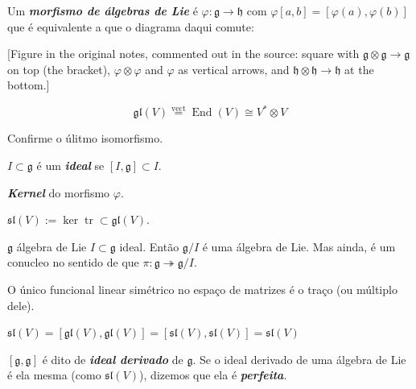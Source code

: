 \begin{definition}
\label{definition-heluani-morphism}
Um {\it\bf morfismo de álgebras de Lie} é
$\varphi:\mathfrak{g} \to \mathfrak{h}$ com
$\varphi[a,b]=[\varphi(a),\varphi(b)]$ que é
equivalente a que o diagrama daqui comute:

[Figure in the original notes, commented out
in the source: square with
$\mathfrak{g}\otimes\mathfrak{g}
\to\mathfrak{g}$
on top (the bracket), $\varphi\otimes\varphi$
and $\varphi$ as vertical arrows, and
$\mathfrak{h}\otimes\mathfrak{h}
\to\mathfrak{h}$
at the bottom.]
\end{definition}

$$\mathfrak{gl}(V)
\overset{\operatorname{vect}}{=}
\operatorname{End}(V)\cong
V^* \otimes V$$
\begin{exercise}
\label{exercise-heluani-iso}
Confirme o úlitmo isomorfismo.
\end{exercise}
\begin{definition}
\label{definition-heluani-ideal}
$I \subset \mathfrak{g}$ é um {\it\bf ideal}
se $[I,\mathfrak{g}] \subset I$.
\end{definition}

\begin{definition}
\label{definition-heluani-kernel}
{\it\bf Kernel} do morfismo $\varphi$.
\end{definition}
\begin{definition}
\label{definition-heluani-sl}
$\mathfrak{sl}(V):=\ker \operatorname{tr}
\subset \mathfrak{gl}(V)$.
\end{definition}
\begin{lemma}
\label{lemma-heluani-quotient}
$\mathfrak{g}$ álgebra de Lie $I \subset
\mathfrak{g}$ ideal. Então $\mathfrak{g}/I$ é
uma álgebra de Lie. Mas ainda, é um conucleo
no sentido de que $\pi:\mathfrak{g}
\twoheadrightarrow \mathfrak{g}/I$.
\end{lemma}
\begin{proposition}
\label{proposition-heluani-trace}
O único funcional  linear simétrico no espaço
de matrizes é o traço (ou múltiplo dele).
\end{proposition}
\begin{corollary}
\label{corollary-heluani-sl-perfect}
$\mathfrak{sl}(V)=[\mathfrak{gl}(V),
\mathfrak{gl}(V)]=[\mathfrak{sl}(V),
\mathfrak{sl}(V)]=\mathfrak{sl}(V)$
\end{corollary}
\begin{definition}
\label{definition-heluani-derived}
$[\mathfrak{g},\mathfrak{g}]$ é dito de
{\it\bf ideal derivado} de  $\mathfrak{g}$.
Se o ideal derivado de uma álgebra de Lie é
ela mesma (como $\mathfrak{sl}(V)$), dizemos
que ela é {\it\bf perfeita}.
\end{definition}

